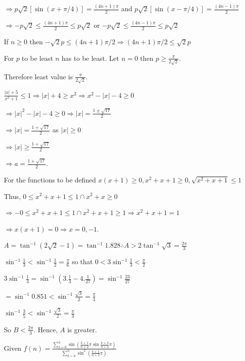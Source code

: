  $\Rightarrow p\sqrt{2}[\sin(x + \pi/4)] = \frac{(4n + 1)\pi}{2}$ and $p\sqrt{2}[\sin(x - \pi/4)]
  = \frac{(4n - 1)\pi}{2}$

  $\Rightarrow -p\sqrt{2}\le \frac{(4n + 1)\pi}{2}\le p\sqrt{2}$ or $-p\sqrt{2}\le \frac{(4n - 1)\pi}{2}\le
  p\sqrt{2}$

  If $n\ge 0$ then $-\sqrt{2}p \le (4n + 1)\pi/2\Rightarrow (4n + 1)\pi/2\le\sqrt{2}p$

  For $p$ to be least $n$ has to be least. Let $n = 0$ then $p \ge \frac{\pi}{2\sqrt{2}}$.

  Therefore least value is $\frac{\pi}{2\sqrt{2}}$.
\item $\frac{|x| + 5}{x^2 + 1}\le 1\Rightarrow |x| + 4\ge x^2 \Rightarrow x^2 - |x| - 4\ge 0$

  $\Rightarrow |x|^2 - |x| - 4\ge 0\Rightarrow |x| = \frac{1 \pm \sqrt{17}}{2}$

  $\Rightarrow |x| = \frac{1 + \sqrt{17}}{2}$ as $|x|\ge 0$

  $\Rightarrow |x| \ge \frac{1 + \sqrt{17}}{2}$

  $\Rightarrow a = \frac{1 + \sqrt{17}}{2}$.
\item For the functions to be defined $x(x + 1)\ge 0, x^2 + x + 1\ge 0, \sqrt{x^2 + x + 1}\le 1$

  Thus, $0\le x^2 + x + 1\le 1\cap x^2 + x\ge 0$

  $\Rightarrow -0\le x^2 + x + 1\le 1\cap x^2 + x + 1\ge 1\Rightarrow x^2 + x + 1 = 1$

  $\Rightarrow x(x + 1) = 0 \Rightarrow x = 0, -1$.
\item $A = \tan^{-1}\left(2\sqrt{2} - 1\right) = \tan^{-1}1.828\therefore A > 2\tan^{-1}\sqrt{3}
  = \frac{2\pi}{3}$

  $\sin^{-1}\frac{1}{3} < \sin^{-1}\frac{1}{2} = \frac{\pi}{6}$ so that $0 < 3\sin^{-1}\frac{1}{3}
  < \frac{\pi}{2}$

  $3\sin^{-1}\frac{1}{3} = \sin^{-1}\left(3.\frac{1}{3} - 4.\frac{1}{27}\right) = \sin^{-1}\frac{23}{27}$

  $= \sin^{-1}0.851 < \sin^{-1}\frac{\sqrt{3}}{2} = \frac{\pi}{3}$

  $\sin^{-1}\frac{3}{5} < \sin^{-1}\frac{\sqrt{3}}{2} = \frac{\pi}{3}$

  So $B < \frac{2\pi}{3}$. Hence, $A$ is greater.
\item Given $\displaystyle f(n) = \frac{\displaystyle \sum_{k =
    0}^n\sin\left(\frac{k + 1}{n + 2}\pi\sin\frac{k + 2}{n + 2}\pi\right)}{\displaystyle\sum_{k =
    0}^n\sin^2\left(\frac{k + 1}{n + 2}\pi\right)}$

